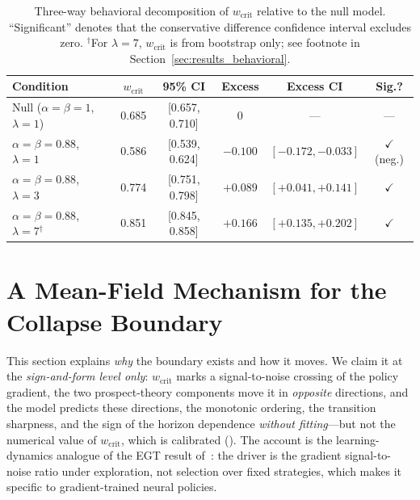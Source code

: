 \documentclass[letterpaper]{article}
\theoremstyle{plain}
\newcommand{\wcrit}{w_{\mathrm{crit}}}
\begin{document}
\begin{table}[t]
\centering
\caption{Three-way behavioral decomposition of $\wcrit$ relative to the
null model. ``Significant'' denotes that the conservative difference
confidence interval excludes zero. $^{\dagger}$For $\lambda{=}7$,
$\wcrit$ is from bootstrap only; see footnote in
Section~\ref{sec:results_behavioral}.}
\label{tab:decomposition}
\small
\begin{tabular}{lccccc}
\toprule
Condition & $\wcrit$ & 95\% CI & Excess & Excess CI & Sig.? \\
\midrule
Null ($\alpha{=}\beta{=}1$, $\lambda{=}1$) & 0.685 & [0.657, 0.710] & 0 & --- & --- \\
$\alpha{=}\beta{=}0.88$, $\lambda{=}1$ & 0.586 & [0.539, 0.624] & $-0.100$ & $[-0.172, -0.033]$ & $\checkmark$ (neg.) \\
$\alpha{=}\beta{=}0.88$, $\lambda{=}3$ & 0.774 & [0.751, 0.798] & $+0.089$ & $[+0.041, +0.141]$ & $\checkmark$ \\
$\alpha{=}\beta{=}0.88$, $\lambda{=}7$$^{\dagger}$ & 0.851 & [0.845, 0.858] & $+0.166$ & $[+0.135, +0.202]$ & $\checkmark$ \\
\bottomrule
\end{tabular}
\end{table}

\section{A Mean-Field Mechanism for the Collapse Boundary}
\label{sec:meanfield}

This section explains \emph{why} the boundary exists and how it moves. We claim
it at the \emph{sign-and-form level only}: $\wcrit$ marks a signal-to-noise
crossing of the policy gradient, the two prospect-theory components move it in
\emph{opposite} directions, and the model predicts these directions, the
monotonic ordering, the transition sharpness, and the sign of the horizon
dependence \emph{without fitting}---but not the numerical value of $\wcrit$,
which is calibrated (). The account is the learning-dynamics
analogue of the EGT result of~\citet{mengesha2025}: the driver is the gradient
signal-to-noise ratio under exploration, not selection over fixed strategies,
which makes it specific to gradient-trained neural policies.
\end{document}
